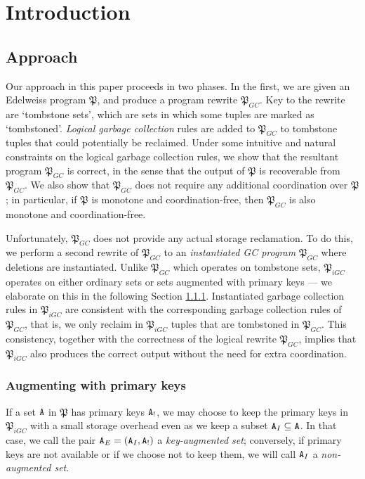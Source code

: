 
\section{Introduction}
\label{sec:intro}

\subsection{Approach}
Our approach in this paper proceeds in two phases.
In the first, we are given an Edelweiss program $\mathfrak{P}$, and produce a program rewrite $\mathfrak{P}_{GC}$.
Key to the rewrite are `tombstone sets', which are sets in which some tuples are marked as `tombstoned'.
\emph{Logical garbage collection} rules are added to $\mathfrak{P}_{GC}$ to tombstone tuples that could potentially be reclaimed.
Under some intuitive and natural constraints on the logical garbage collection rules, we show that the resultant program $\mathfrak{P}_{GC}$ is correct, in the sense that the output of $\mathfrak{P}$ is recoverable from $\mathfrak{P}_{GC}$.
We also show that $\mathfrak{P}_{GC}$ does not require any additional coordination over $\mathfrak{P}$;
in particular, if $\mathfrak{P}$ is monotone and coordination-free, then $\mathfrak{P}_{GC}$ is also monotone and coordination-free.

Unfortunately, $\mathfrak{P}_{GC}$ does not provide any actual storage reclamation.
To do this, we perform a second rewrite of $\mathfrak{P}_{GC}$ to an \emph{instantiated GC program} $\mathfrak{P}_{GC}$ where deletions are instantiated.
Unlike $\mathfrak{P}_{GC}$ which operates on tombstone sets, $\mathfrak{P}_{iGC}$ operates on either ordinary sets or sets augmented with primary keys --- we elaborate on this in the following Section \ref{sec:intro:approach:augment}.
Instantiated garbage collection rules in $\mathfrak{P}_{iGC}$ are consistent with the corresponding garbage collection rules of $\mathfrak{P}_{GC}$, that is, we only reclaim in $\mathfrak{P}_{iGC}$ tuples that are tombstoned in $\mathfrak{P}_{GC}$.
This consistency, together with the correctness of the logical rewrite $\mathfrak{P}_{GC}$, implies that $\mathfrak{P}_{iGC}$ also produces the correct output without the need for extra coordination.

\subsubsection{Augmenting with primary keys}
\label{sec:intro:approach:augment}
If a set $\tt{A}$ in $\mathfrak{P}$ has primary keys $\tt{A}_!$, we may choose to keep the primary keys in $\mathfrak{P}_{iGC}$ with a small storage overhead even as we keep a subset $\tt{A}_I \subseteq \tt{A}$.
In that case, we call the pair $\tt{A}_E = (\tt{A}_I, \tt{A}_!)$ a \emph{key-augmented set};
conversely, if primary keys are not available or if we choose not to keep them, we will call $\tt{A}_I$ a \emph{non-augmented set}.

